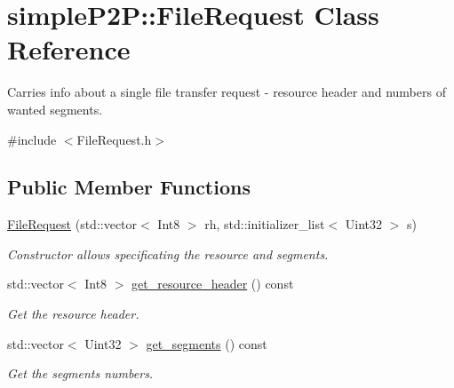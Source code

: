 \hypertarget{classsimpleP2P_1_1FileRequest}{}\section{simple\+P2P\+:\+:File\+Request Class Reference}
\label{classsimpleP2P_1_1FileRequest}


Carries info about a single file transfer request -\/ resource header and numbers of wanted segments.  




{\ttfamily \#include $<$File\+Request.\+h$>$}

\subsection*{Public Member Functions}
\begin{DoxyCompactItemize}
\item 
\hyperlink{classsimpleP2P_1_1FileRequest_a10e638217e87f34d01c527b919e238e4}{File\+Request} (std\+::vector$<$ Int8 $>$ rh, std\+::initializer\+\_\+list$<$ Uint32 $>$ s)
\begin{DoxyCompactList}\small\item\em Constructor allows specificating the resource and segments. \end{DoxyCompactList}\item 
\mbox{\label{classsimpleP2P_1_1FileRequest_abc003e2b2e4f5966e08f8a09ca05bac8}} 
std\+::vector$<$ Int8 $>$ \hyperlink{classsimpleP2P_1_1FileRequest_abc003e2b2e4f5966e08f8a09ca05bac8}{get\+\_\+resource\+\_\+header} () const
\begin{DoxyCompactList}\small\item\em Get the resource header. \end{DoxyCompactList}\item 
\mbox{\label{classsimpleP2P_1_1FileRequest_a4d8b93821844d17ae11b4dc82097db28}} 
std\+::vector$<$ Uint32 $>$ \hyperlink{classsimpleP2P_1_1FileRequest_a4d8b93821844d17ae11b4dc82097db28}{get\+\_\+segments} () const
\begin{DoxyCompactList}\small\item\em Get the segments\textquotesingle{} numbers. \end{DoxyCompactList}\end{DoxyCompactItemize}


